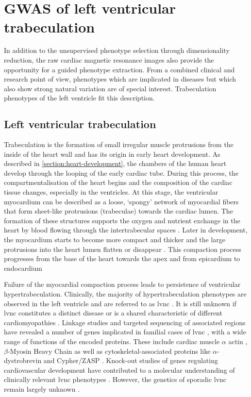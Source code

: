 \chapter{GWAS of left ventricular trabeculation}
\label{chapter:GWAS-FD}
In addition to the unsupervised phenotype selection through dimensionality reduction, the raw cardiac magnetic resonance images also provide the opportunity for a guided phenotype extraction. From a combined clinical and research point of view, phenotypes which are implicated in diseases but which also show strong natural variation are of special interest. Trabeculation phenotypes of the left ventricle fit this description.

\section{Left ventricular trabeculation}
\label{section:intro-FD}
Trabeculation is the formation of small irregular muscle protrusions from the inside of the heart wall and has its origin in early heart development. As described in \cref{section:heart-development}, the chambers of the human heart develop through the looping of the early cardiac tube. During this process, the compartmentalisation of the heart begins and the composition of the cardiac tissue changes, especially in the ventricles. At this stage, the ventricular myocardium can be described as a loose, `spongy' network of myocardial fibers that form sheet-like protrusions (trabeculae) towards the cardiac lumen. The formation of these structures supports the oxygen and nutrient exchange in the heart \citep{Chen2009} by blood flowing through the intertrabecular spaces \citep{Zambrano2002}. Later in development, the myocardium starts to become more compact and thicker and the large protrusions into the heart lumen flatten or disappear \citep{Yousef2009}. This compaction process progresses from the base of the heart towards the apex and from epicardium to endocardium \citep{Zambrano2002}

Failure of the myocardial compaction process leads to persistence of ventricular hypertrabeculation. Clinically, the majority of hypertrabeculation phenotypes are observed in the left ventricle and are referred to as \gls{lvnc} \citep{Zambrano2002}. It is still unknown if \gls{lvnc} constitutes a distinct disease or is a shared characteristic of different cardiomyopathies \citep{Captur2013}. Linkage studies and targeted sequencing of associated regions have revealed a number of genes implicated in familial cases of \gls{lvnc} \citep{Bleyl1997,Klaassen2008,Moric-Janiszewska2008}, with a wide range of functions of the encoded proteins. These include cardiac muscle \(\alpha\) actin \citep{Monserrat2007}, 
\(\beta\)-Myosin Heavy Chain \citep{Budde2007} as well as cytoskeletal-associated proteins like \(\alpha\)-dystrobrevin \citep{Ichida2001} and Cypher/ZASP \citep{Vatta2003}. Knock-out studies of genes regulating cardiovascular development have contributed to a molecular understanding of clinically relevant \gls{lvnc} phenotypes \citep{Chen2009,Mysliwiec2011}. However, the genetics of sporadic \gls{lvnc} remain largely unknown \citep{Zambrano2002}.

